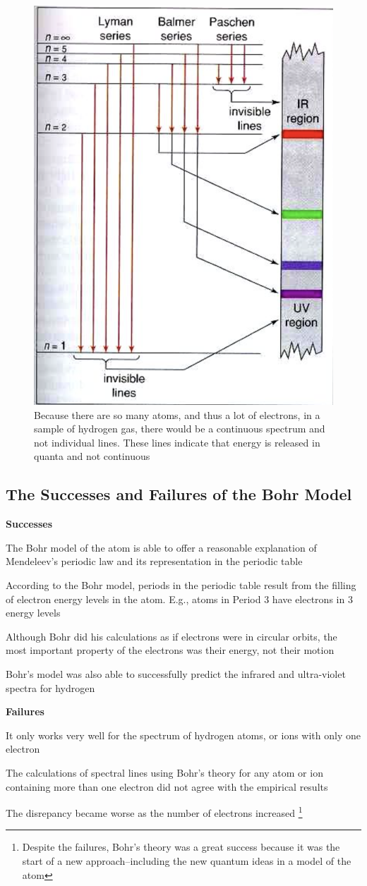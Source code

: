 \begin{figure}[ht!]
    \centering
    \includegraphics[width=0.4 \textwidth]{../figures/hydrogen-spectrum-lines.png}
    \caption{Because there are so many atoms, and thus a lot of electrons, in a sample of hydrogen 
            gas, there would be a continuous spectrum and not individual lines. These lines indicate
            that energy is released in quanta and not continuous}
    \label{fig:hydrogen-spectrum-lines}
\end{figure}

\subsection{The Successes and Failures of the Bohr Model}
\textbf{Successes}
\begin{bulleted-list}
    \item The Bohr model of the atom is able to offer a reasonable explanation of Mendeleev's
        periodic law and its representation in the periodic table
    \item According to the Bohr model, periods in the periodic table result from the filling of
        electron energy levels in the atom. E.g., atoms in Period 3 have electrons in 3 energy
        levels
    \item Although Bohr did his calculations as if electrons were in circular orbits, the most
        important property of the electrons was their energy, not their motion
    \item Bohr's model was also able to successfully predict the infrared and ultra-violet spectra
        for hydrogen
\end{bulleted-list}
\textbf{Failures}
\begin{bulleted-list}
    \item It only works very well for the spectrum of hydrogen atoms, or ions with only one
        electron
    \item The calculations of spectral lines using Bohr's theory for any atom or ion containing
        more than one electron did not agree with the empirical results
    \item The disrepancy became worse as the number of electrons increased
        \footnote{
            Despite the failures, Bohr's theory was a great success because it was the start
            of a new approach--including the new quantum ideas in a model of the atom
        }
\end{bulleted-list}

